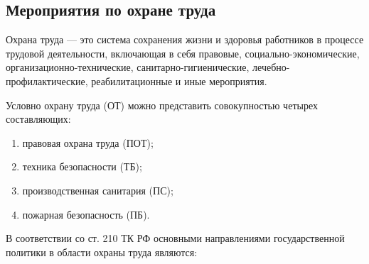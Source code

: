
\subsection{Мероприятия по охране труда}

Охрана труда --- это система сохранения жизни и здоровья работников в процессе трудовой деятельности, включающая в себя правовые, социально-экономические, организационно-технические, санитарно-гигиенические, лечебно-профилактические, реабилитационные и иные мероприятия.

Условно охрану труда (ОТ) можно представить совокупностью четырех составляющих:

\begin{enumerate}[1.]
	\item правовая охрана труда (ПОТ);
	\item техника безопасности (ТБ);
	\item производственная санитария (ПС);
	\item пожарная безопасность (ПБ).
\end{enumerate}

В соответствии со ст. 210 ТК РФ основными направлениями государственной политики в области охраны труда являются:

